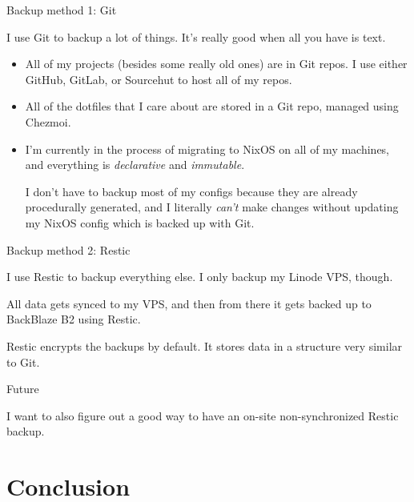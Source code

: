 \documentclass{lug}
\begin{document}
\begin{frame}{Backup method 1: Git}

    I use Git to backup a lot of things. It's really good when all you have is
    text.
    \pause

    \begin{itemize}[<+->]
        \item All of my projects (besides some really old ones) are in Git
            repos. I use either GitHub, GitLab, or Sourcehut to host all of my
            repos.
        \item All of the dotfiles that I care about are stored in a Git repo,
            managed using Chezmoi.
        \item I'm currently in the process of migrating to NixOS on all of my
            machines, and everything is \textit{declarative} and
            \textit{immutable}.

            \pause[\thebeamerpauses]
            I don't have to backup most of my configs because they are already
            procedurally generated, and I literally \textit{can't} make changes
            without updating my NixOS config which is backed up with Git.

    \end{itemize}

\end{frame}

\begin{frame}{Backup method 2: Restic}

    I use Restic to backup everything else. I only backup my Linode VPS, though.

    \pause
    All data gets synced to my VPS, and then from there it gets backed up to
    BackBlaze B2 using Restic.

    \pause
    Restic encrypts the backups by default. It stores data in a structure very
    similar to Git.

\end{frame}

\begin{frame}{Future}

    I want to also figure out a good way to have an on-site non-synchronized
    Restic backup.

\end{frame}

\section{Conclusion}
\end{document}
